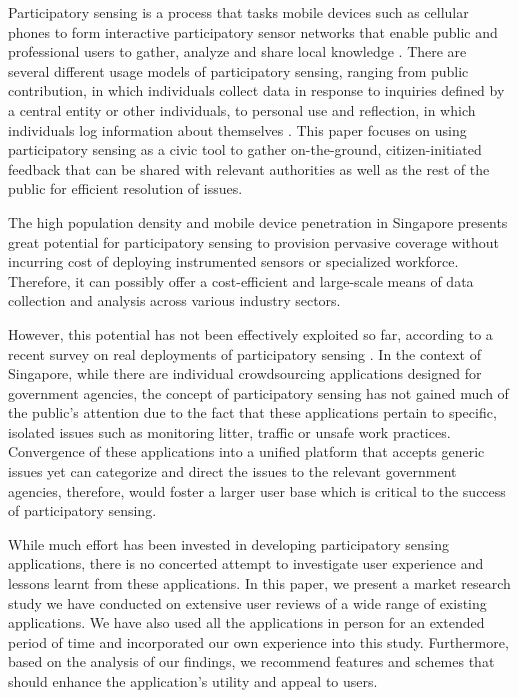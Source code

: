 \documentclass[conference,10pt]{IEEEtran}
\begin{document}
Participatory sensing is a process that tasks mobile devices such as cellular phones to form interactive participatory sensor networks that enable public and professional users to gather, analyze and share local knowledge \cite{Gol0509}. There are several different usage models of participatory sensing, ranging from public contribution, in which individuals collect data in response to inquiries defined by a central entity or other individuals, to personal use and reflection, in which individuals log information about themselves \cite{estrin10inet}. This paper focuses on using participatory sensing as a civic tool to gather on-the-ground, citizen-initiated feedback that can be shared with relevant authorities as well as the rest of the public for efficient resolution of issues.

The high population density and mobile device penetration in Singapore presents great potential for participatory sensing to provision pervasive coverage without incurring cost of deploying instrumented sensors or specialized workforce. Therefore, it can possibly offer a cost-efficient and large-scale means of data collection and analysis across various industry sectors.

However, this potential has not been effectively exploited so far, according to a recent survey on real deployments of participatory sensing \cite{Til0313}. In the context of Singapore, while there are individual crowdsourcing applications designed for government agencies, the concept of participatory sensing has not gained much of the public's attention due to the fact that these applications pertain to specific, isolated issues such as monitoring litter, traffic or unsafe work practices. Convergence of these applications into a unified platform that accepts generic issues yet can categorize and direct the issues to the relevant government agencies, therefore, would foster a larger user base which is critical to the success of participatory sensing.



While much effort has been invested in developing participatory sensing applications, there is no concerted attempt to investigate user experience and lessons learnt from these applications. In this paper, we present a market research study we have conducted on extensive user reviews of a wide range of existing applications. We have also used all the applications in person for an extended period of time and incorporated our own experience into this study. Furthermore, based on the analysis of our findings, we recommend features and schemes that should enhance the application's utility and appeal to users.
\end{document}
